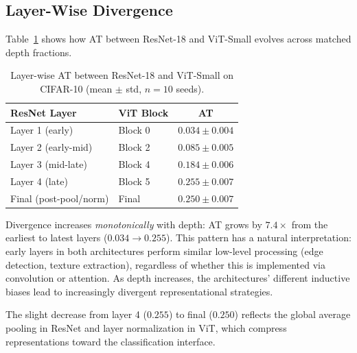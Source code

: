 \documentclass{article}
\begin{document}
\subsection{Layer-Wise Divergence}

Table~\ref{tab:layerwise} shows how AT between ResNet-18 and ViT-Small evolves across matched depth fractions.

\begin{table}[t]
\caption{Layer-wise AT between ResNet-18 and ViT-Small on CIFAR-10 (mean $\pm$ std, $n{=}10$ seeds).}
\label{tab:layerwise}
\centering
\small
\begin{tabular}{@{}llc@{}}
\toprule
ResNet Layer & ViT Block & AT \\
\midrule
Layer 1 (early)      & Block 0 & $0.034 \pm 0.004$ \\
Layer 2 (early-mid)  & Block 2 & $0.085 \pm 0.005$ \\
Layer 3 (mid-late)   & Block 4 & $0.184 \pm 0.006$ \\
Layer 4 (late)       & Block 5 & $0.255 \pm 0.007$ \\
Final (post-pool/norm) & Final  & $0.250 \pm 0.007$ \\
\bottomrule
\end{tabular}
\end{table}

Divergence increases \emph{monotonically} with depth: AT grows by $7.4\times$ from the earliest to latest layers ($0.034 \to 0.255$). This pattern has a natural interpretation: early layers in both architectures perform similar low-level processing (edge detection, texture extraction), regardless of whether this is implemented via convolution or attention. As depth increases, the architectures' different inductive biases lead to increasingly divergent representational strategies.

The slight decrease from layer 4 ($0.255$) to final ($0.250$) reflects the global average pooling in ResNet and layer normalization in ViT, which compress representations toward the classification interface.
\end{document}
